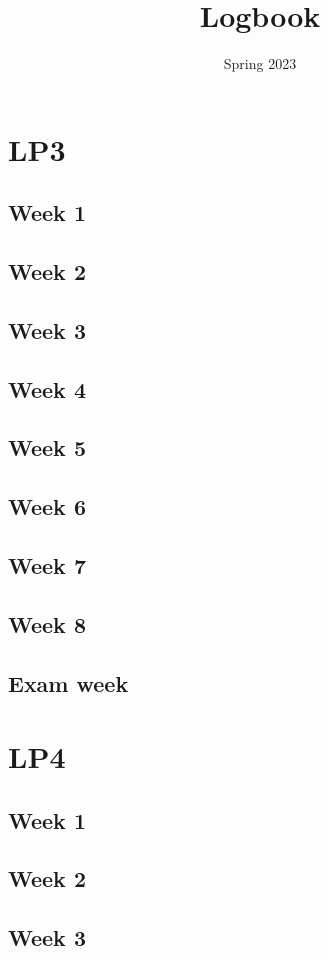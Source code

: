 \documentclass{article}
\title{Logbook}
\date{Spring 2023}
\newcommand{\logentry}[2]{
    \subsection{Week #2}
    
    \newpage
}
\newcommand{\customlogentry}[3]{
    \subsection{#3}
    
    \newpage
}
\begin{document}
\maketitle
\newpage
\tableofcontents
\newpage


\section{LP3}
    \logentry{3}{1}
    \logentry{3}{2}
    \logentry{3}{3}
    \logentry{3}{4}
    \logentry{3}{5}
    \logentry{3}{6}
    \logentry{3}{7}
    \logentry{3}{8}
    \customlogentry{3}{Exam}{Exam week}

\section{LP4}
    \logentry{4}{1}
    \logentry{4}{2}
    \logentry{4}{3}
\end{document}
